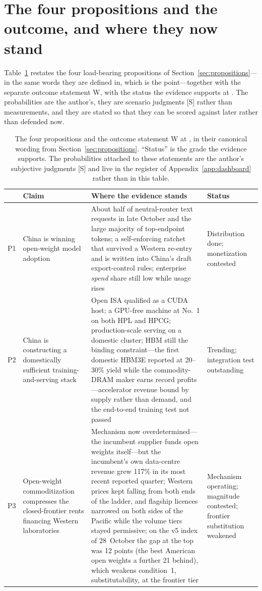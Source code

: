 \section{The four propositions and the outcome, and where they now stand}
\label{sec:summary-props}

Table~\ref{tab:summary-props} restates the four load-bearing propositions of Section~\ref{sec:propositions}---in the same words they are defined in, which is the point---together with the separate outcome statement W, with the status the evidence supports at \datafreeze. The probabilities are the author's, they are scenario judgments [S] rather than measurements, and they are stated so that they can be scored against later rather than defended now.

\begin{table}[htbp]
\centering\footnotesize
\caption{The four propositions and the outcome statement W at \datafreeze, in their canonical wording from Section~\ref{sec:propositions}. ``Status'' is the grade the evidence supports. The probabilities attached to these statements are the author's subjective judgments [S] and live in the register of Appendix~\ref{app:dashboard} rather than in this table.}
\label{tab:summary-props}
\begin{tabular}{@{}p{9mm}p{40mm}p{55mm}p{28mm}@{}}
\toprule
& \textbf{Claim} & \textbf{Where the evidence stands} & \textbf{Status} \\
\midrule
P1 & China is winning open-weight model adoption & About half of neutral-router text requests in late October and the large majority of top-endpoint tokens; a self-enforcing ratchet that survived a Western re-entry and is written into China's draft export-control rules; enterprise \emph{spend} share still low while usage rises & Distribution done; monetization contested \\
\addlinespace
P2 & China is constructing a domestically sufficient training-and-serving stack & Open ISA qualified as a CUDA host; a GPU-free machine at No.~1 on both HPL and HPCG; production-scale serving on a domestic cluster; HBM still the binding constraint---the first domestic HBM3E reported at 20--30\% yield while the commodity-DRAM maker earns record profits---accelerator revenue bound by supply rather than demand, and the end-to-end training test not passed & Trending; integration test outstanding \\
\addlinespace
P3 & Open-weight commoditization compresses the closed-frontier rents financing Western laboratories & Mechanism now overdetermined---the incumbent supplier funds open weights itself---but the incumbent's own data-centre revenue grew 117\% in its most recent reported quarter; Western prices kept falling from both ends of the ladder, and flagship licences narrowed on both sides of the Pacific while the volume tiers stayed permissive; on the v5 index of 28~October the gap at the top was 12 points (the best American open weights a further 21 behind), which weakens condition~1, substitutability, at the frontier tier & Mechanism operating; magnitude contested; frontier substitution weakened \\

\end{tabular}
\end{table}
